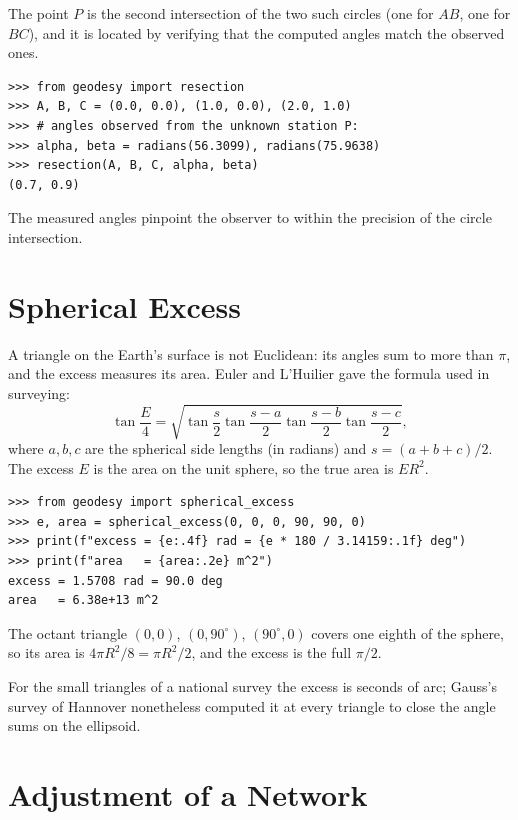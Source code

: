 The point $P$ is the second intersection of the two such circles (one for $AB$, one for $BC$), and it is located by verifying that the computed angles match the observed ones.

\begin{example}[Resection]
\begin{lstlisting}[style=python]
>>> from geodesy import resection
>>> A, B, C = (0.0, 0.0), (1.0, 0.0), (2.0, 1.0)
>>> # angles observed from the unknown station P:
>>> alpha, beta = radians(56.3099), radians(75.9638)
>>> resection(A, B, C, alpha, beta)
(0.7, 0.9)
\end{lstlisting}
The measured angles pinpoint the observer to within the precision of the circle intersection.
\end{example}

\section{Spherical Excess}

A triangle on the Earth's surface is not Euclidean: its angles sum to more than $\pi$, and the excess measures its area. Euler and L'Huilier gave the formula used in surveying:
\[
\tan\frac{E}{4} = \sqrt{\tan\frac{s}{2}\tan\frac{s-a}{2}\tan\frac{s-b}{2}\tan\frac{s-c}{2}},
\]
where $a, b, c$ are the spherical side lengths (in radians) and $s = (a+b+c)/2$. The excess $E$ is the area on the unit sphere, so the true area is $E R^2$.

\begin{example}
\begin{lstlisting}[style=python]
>>> from geodesy import spherical_excess
>>> e, area = spherical_excess(0, 0, 0, 90, 90, 0)
>>> print(f"excess = {e:.4f} rad = {e * 180 / 3.14159:.1f} deg")
>>> print(f"area   = {area:.2e} m^2")
excess = 1.5708 rad = 90.0 deg
area   = 6.38e+13 m^2
\end{lstlisting}
The octant triangle $(0,0)$, $(0,90^\circ)$, $(90^\circ,0)$ covers one eighth of the sphere, so its area is $4\pi R^2/8 = \pi R^2/2$, and the excess is the full $\pi/2$.
\end{example}

For the small triangles of a national survey the excess is seconds of arc; Gauss's survey of Hannover nonetheless computed it at every triangle to close the angle sums on the ellipsoid.

\section{Adjustment of a Network}


